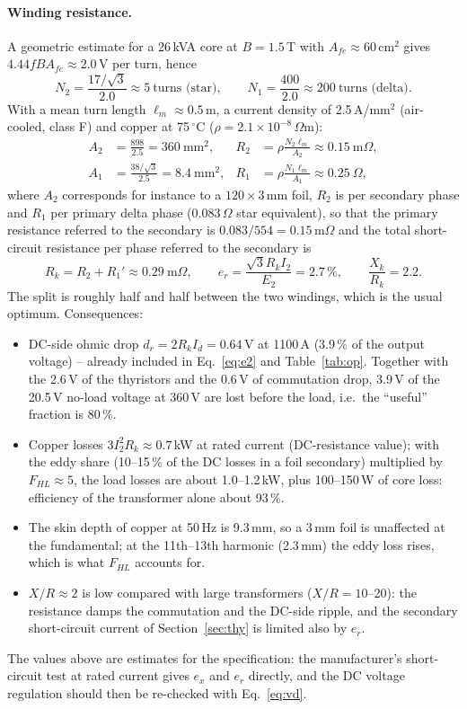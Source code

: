 \documentclass[11pt,a4paper]{article}
\newcommand{\Id}{I_d}
\newcommand{\Ell}{E_{2}}
\begin{document}
\paragraph{Winding resistance.} A geometric estimate for a 26\,kVA core at $B = 1.5$\,T with $A_{fe} \approx 60$\,cm$^2$ gives $4.44 f B A_{fe} \approx 2.0$\,V per turn, hence
\[
N_2 = \frac{17/\sqrt3}{2.0} \approx 5\ \text{turns (star)}, \qquad N_1 = \frac{400}{2.0} \approx 200\ \text{turns (delta)}.
\]
With a mean turn length $\ell_m \approx 0.5$\,m, a current density of 2.5\,A/mm$^2$ (air-cooled, class F) and copper at 75\,$^\circ$C ($\rho = 2.1\times10^{-8}$\,$\Omega$m):
\begin{align*}
A_2 &= \frac{898}{2.5} = 360\ \text{mm}^2, & R_2 &= \rho\frac{N_2\ell_m}{A_2} \approx 0.15\ \text{m}\Omega,\\
A_1 &= \frac{38/\sqrt3}{2.5} = 8.4\ \text{mm}^2, & R_1 &= \rho\frac{N_1\ell_m}{A_1} \approx 0.25\ \Omega,
\end{align*}
where $A_2$ corresponds for instance to a $120\times3$\,mm foil, $R_2$ is per secondary phase and $R_1$ per primary delta phase (0.083\,$\Omega$ star equivalent), so that the primary resistance referred to the secondary is $0.083/554 = 0.15$\,m$\Omega$ and the total short-circuit resistance per phase referred to the secondary is
\[
R_k = R_2 + R_1' \approx 0.29\ \text{m}\Omega, \qquad e_r = \frac{\sqrt3 R_k I_2}{\Ell} = 2.7\,\%, \qquad \frac{X_k}{R_k} = 2.2.
\]
The split is roughly half and half between the two windings, which is the usual optimum. Consequences:
\begin{itemize}
\item DC-side ohmic drop $d_r = 2R_k\Id = 0.64$\,V at 1100\,A (3.9\,\% of the output voltage) -- already included in Eq.~\eqref{eq:e2} and Table~\ref{tab:op}. Together with the 2.6\,V of the thyristors and the 0.6\,V of commutation drop, 3.9\,V of the 20.5\,V no-load voltage at 360\,V are lost before the load, i.e.\ the ``useful'' fraction is 80\,\%.
\item Copper losses $3I_2^2R_k \approx 0.7$\,kW at rated current (DC-resistance value); with the eddy share (10--15\,\% of the DC losses in a foil secondary) multiplied by $F_{HL} \approx 5$, the load losses are about 1.0--1.2\,kW, plus 100--150\,W of core loss: efficiency of the transformer alone about 93\,\%.
\item The skin depth of copper at 50\,Hz is 9.3\,mm, so a 3\,mm foil is unaffected at the fundamental; at the 11th--13th harmonic (2.3\,mm) the eddy loss rises, which is what $F_{HL}$ accounts for.
\item $X/R \approx 2$ is low compared with large transformers ($X/R = 10$--20): the resistance damps the commutation and the DC-side ripple, and the secondary short-circuit current of Section~\ref{sec:thy} is limited also by $e_r$.
\end{itemize}
The values above are estimates for the specification: the manufacturer's short-circuit test at rated current gives $e_x$ and $e_r$ directly, and the DC voltage regulation should then be re-checked with Eq.~\eqref{eq:vd}.
\end{document}
